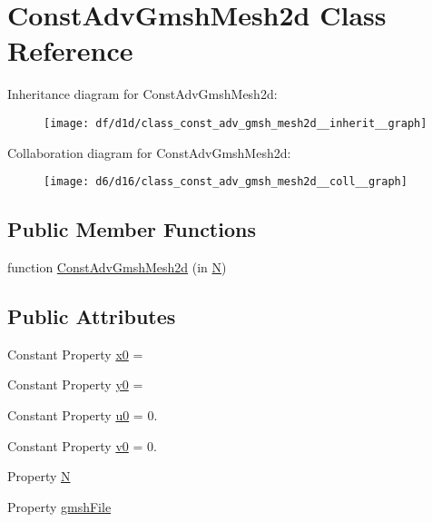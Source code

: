 \hypertarget{class_const_adv_gmsh_mesh2d}{}\section{Const\+Adv\+Gmsh\+Mesh2d Class Reference}
\label{class_const_adv_gmsh_mesh2d}


Inheritance diagram for Const\+Adv\+Gmsh\+Mesh2d\+:
\nopagebreak
\begin{figure}[H]
\begin{center}
\leavevmode
\texttt{[image: df/d1d/class\_const\_adv\_gmsh\_mesh2d\_\_inherit\_\_graph]}
\end{center}
\end{figure}


Collaboration diagram for Const\+Adv\+Gmsh\+Mesh2d\+:
\nopagebreak
\begin{figure}[H]
\begin{center}
\leavevmode
\texttt{[image: d6/d16/class\_const\_adv\_gmsh\_mesh2d\_\_coll\_\_graph]}
\end{center}
\end{figure}
\subsection*{Public Member Functions}
\begin{DoxyCompactItemize}
\item 
function \hyperlink{class_const_adv_gmsh_mesh2d_a0acb215596532172f7ac332d9235cfdf}{Const\+Adv\+Gmsh\+Mesh2d} (in \hyperlink{class_const_adv_gmsh_mesh2d_a5fdc43b6f658bf136a29d9ff5cd2988d}{N})
\end{DoxyCompactItemize}
\subsection*{Public Attributes}
\begin{DoxyCompactItemize}
\item 
Constant Property \hyperlink{class_const_adv_gmsh_mesh2d_a436db069d6ad38810438e90595e8a627}{x0} =
\item 
Constant Property \hyperlink{class_const_adv_gmsh_mesh2d_a71e243acbeba03a7fc676a4f00eb5ca4}{y0} =
\item 
Constant Property \hyperlink{class_const_adv_gmsh_mesh2d_ab5ef40a2bbb5c061dc40c33383ac665c}{u0} = 0.
\item 
Constant Property \hyperlink{class_const_adv_gmsh_mesh2d_a87629bb082926fe42364445839c7e63f}{v0} = 0.
\item 
Property \hyperlink{class_const_adv_gmsh_mesh2d_a5fdc43b6f658bf136a29d9ff5cd2988d}{N}
\item 
Property \hyperlink{class_const_adv_gmsh_mesh2d_a24329a17c5aa83609f5c0761e2984129}{gmsh\+File}
\end{DoxyCompactItemize}
